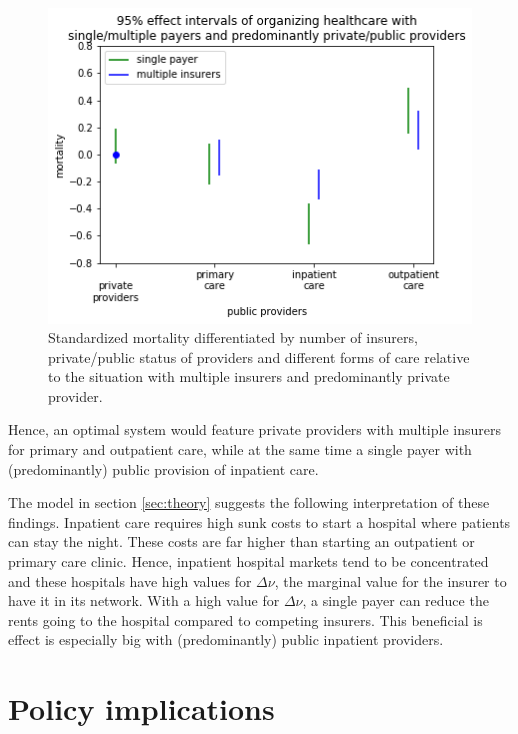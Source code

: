 \documentclass{article}
\begin{document}
\begin{figure}[htbp]
\centering
\includegraphics[width=.9\linewidth]{./figures/single_multiple_public_private.png}
\caption{\label{fig:org02f0695}Standardized mortality differentiated by number of insurers, private/public status of providers and different forms of care relative to the situation with multiple insurers and predominantly private provider.}
\end{figure}

Hence, an optimal system would feature private providers with multiple insurers for primary and outpatient care, while at  the same time a single payer with (predominantly) public provision of inpatient care.

The model in section \ref{sec:theory} suggests the following interpretation of these findings. Inpatient care requires high sunk costs to start a hospital where patients can stay the night. These costs are far higher than starting an outpatient or primary care clinic. Hence, inpatient hospital markets tend to be concentrated and these hospitals have high values for \(\Delta \nu\), the marginal value for the insurer to have it in its network. With a high value for \(\Delta \nu\), a single payer can reduce the rents going to the hospital compared to competing insurers. This beneficial is effect is especially big with (predominantly) public inpatient providers.


\section{Policy implications}
\label{sec:org807ef87}
\end{document}
